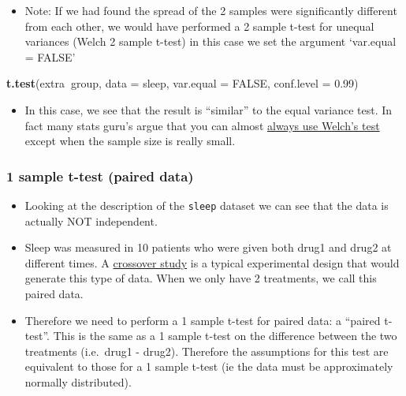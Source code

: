 \documentclass[]{article}
\newenvironment{Shaded}{\begin{snugshade}}{\end{snugshade}}
\newcommand{\DataTypeTok}[1]{\textcolor[rgb]{0.13,0.29,0.53}{#1}}
\newcommand{\FloatTok}[1]{\textcolor[rgb]{0.00,0.00,0.81}{#1}}
\newcommand{\KeywordTok}[1]{\textcolor[rgb]{0.13,0.29,0.53}{\textbf{#1}}}
\newcommand{\NormalTok}[1]{#1}
\newcommand{\OperatorTok}[1]{\textcolor[rgb]{0.81,0.36,0.00}{\textbf{#1}}}
\newcommand{\OtherTok}[1]{\textcolor[rgb]{0.56,0.35,0.01}{#1}}
\providecommand{\tightlist}{%
  \setlength{\itemsep}{0pt}\setlength{\parskip}{0pt}}
\begin{document}
\begin{itemize}
\tightlist
\item
  Note: If we had found the spread of the 2 samples were significantly different from each other, we would have performed a 2 sample t-test for unequal variances (Welch 2 sample t-test) in this case we set the argument `var.equal = FALSE'
\end{itemize}

\begin{Shaded}
\begin{Highlighting}[]
\KeywordTok{t.test}\NormalTok{(extra}\OperatorTok{~}\NormalTok{group, }\DataTypeTok{data =}\NormalTok{ sleep, }\DataTypeTok{var.equal =} \OtherTok{FALSE}\NormalTok{, }\DataTypeTok{conf.level =} \FloatTok{0.99}\NormalTok{)}
\end{Highlighting}
\end{Shaded}

\begin{itemize}
\tightlist
\item
  In this case, we see that the result is ``similar'' to the equal variance test. In fact many stats guru's argue that you can almost \href{http://daniellakens.blogspot.com.au/2015/01/always-use-welchs-t-test-instead-of.html}{always use Welch's test} except when the sample size is really small.
\end{itemize}

\hypertarget{sample-t-test-paired-data}{%
\subsubsection{1 sample t-test (paired data)}\label{sample-t-test-paired-data}}

\begin{itemize}
\item
  Looking at the description of the \texttt{sleep} dataset we can see that the data is actually NOT independent.
\item
  Sleep was measured in 10 patients who were given both drug1 and drug2 at different times. A \href{https://en.wikipedia.org/wiki/Crossover_study}{crossover study} is a typical experimental design that would generate this type of data. When we only have 2 treatments, we call this paired data.
\item
  Therefore we need to perform a 1 sample t-test for paired data: a ``paired t-test''. This is the same as a 1 sample t-test on the difference between the two treatments (i.e.~drug1 - drug2). Therefore the assumptions for this test are equivalent to those for a 1 sample t-test (ie the data must be approximately normally distributed).
\end{itemize}
\end{document}
